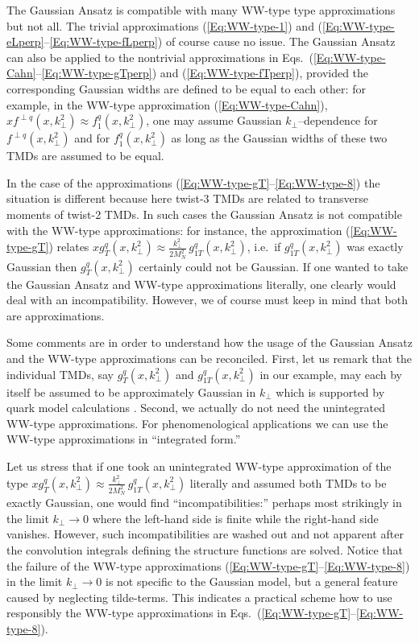 \documentclass[a4paper,11pt]{article}
\def\kperp{k_\perp}
\begin{document}
{The Gaussian Ansatz is compatible with many WW-type type approximations
but not all. The trivial approximations (\ref{Eq:WW-type-1}) and
(\ref{Eq:WW-type-eLperp}--\ref{Eq:WW-type-fLperp}) of course 
cause no issue. 
The Gaussian Ansatz can also be applied to the nontrivial approximations 
in Eqs.~(\ref{Eq:WW-type-Cahn}--\ref{Eq:WW-type-gTperp})
and (\ref{Eq:WW-type-fTperp}), provided the corresponding Gaussian 
widths are defined to be equal to each other: for example, in the 
WW-type approximation (\ref{Eq:WW-type-Cahn}),
$xf^{\perp q}(x,\kperp^2)\approx f_1^q(x,\kperp^2)$, one may 
assume Gaussian $\kperp$--dependence for $f^{\perp q}(x,\kperp^2)$ 
and for $f_1^q(x,\kperp^2)$ as long as the Gaussian widths
of these two TMDs are assumed to be equal.

In the case of the approximations 
(\ref{Eq:WW-type-gT}--\ref{Eq:WW-type-8})
the situation is different because here twist-3 TMDs
are related to transverse moments of twist-2 TMDs. In such cases the 
Gaussian Ansatz is not compatible with the WW-type approximations:
for instance, the approximation (\ref{Eq:WW-type-gT}) relates
$xg_T^q(x,\kperp^2)\approx\frac{k_\perp^2}{2M_N^2}\,g_{1T}^{q}(x,\kperp^2)$,
i.e.\ if $g_{1T}^q(x,\kperp^2)$ was exactly Gaussian then 
$g_T^q(x,\kperp^2)$ certainly could not be Gaussian. If one wanted to take
the Gaussian Ansatz and WW-type approximations literally, one clearly
would deal with an incompatibility. However, we of course must keep 
in mind that both are approximations. 

Some comments are in order to understand how the usage of the Gaussian 
Ansatz and the WW-type approximations can be reconciled.
First, let us remark that the individual TMDs, say 
$g_T^q(x,\kperp^2)$ and $g_{1T}^{q}(x,\kperp^2)$ in our example,
may each by itself be assumed to be approximately Gaussian in $k_\perp$
which is supported by quark model calculations \cite{Avakian:2010br}.
Second, we actually do not need the unintegrated WW-type approximations. 
For phenomenological applications we can use the WW-type approximations 
in ``integrated form.'' 

Let us stress that if one took an unintegrated WW-type approximation of the 
type $xg_T^q(x,\kperp^2)\approx\frac{k_\perp^2}{2M_N^2}\,g_{1T}^{q}(x,\kperp^2)$
literally and assumed both TMDs to be exactly Gaussian, one would find
``incompatibilities:'' perhaps most strikingly in the limit $k_\perp\to 0$
where the left-hand side is finite while the right-hand side vanishes.
However, such incompatibilities are washed out and not apparent after
the convolution integrals defining the structure functions are solved.
Notice that the failure of the WW-type approximations
(\ref{Eq:WW-type-gT}--\ref{Eq:WW-type-8}) in the limit $k_\perp\to 0$ is 
not specific to the Gaussian model,
but a general feature caused by neglecting tilde-terms. This indicates 
a practical scheme how to use responsibly the WW-type approximations in 
Eqs.~(\ref{Eq:WW-type-gT}--\ref{Eq:WW-type-8}).

}
\end{document}
